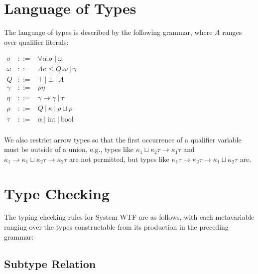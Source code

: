 \documentclass{article}
\begin{document}
\section{Language of Types}

The language of types is described by the following grammar, where $A$ ranges over qualifier literals:

\begin{math}
\begin{array}{rcl}
\sigma & ::= & \forall \alpha . \sigma\ |\ \omega \\

\omega & ::= & \Lambda \kappa \le Q . \omega\ |\ \gamma \\

Q & ::= & \top\ |\ \bot\ |\ A \\

\gamma & ::= & \rho \eta \\

\eta & ::= & \gamma \rightarrow \gamma\ |\ \tau \\

\rho & ::= & Q\ |\ \kappa\ |\ \rho \sqcup \rho \\

\tau & ::= & \alpha\ |\ \textrm{int}\ |\ \textrm{bool} \\

\end{array}
\end{math}

We also restrict arrow types so that the first occurrence of a qualifier variable must be outside of a union, e.g., types like ${\kappa}_1 \sqcup {\kappa}_2 \tau \rightarrow {\kappa}_1 \tau$ and ${\kappa}_1 \rightarrow {\kappa}_1 \sqcup {\kappa}_2 \tau \rightarrow {\kappa}_2 \tau$ are not permitted, but types like ${\kappa}_1 \tau \rightarrow {\kappa}_2 \tau \rightarrow {\kappa}_1 \sqcup {\kappa}_2 \tau$ are.


\section{Type Checking}

The typing checking rules for System WTF are as follows, with each metavariable ranging over the types constructable from its production in the preceding grammar:

\subsection{Subtype Relation}
\end{document}
